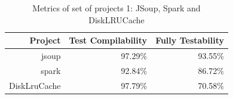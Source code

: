 \begin{figure}[!htb]
\begin{minipage}{.5\textwidth}
        \label{fig:disklrucache}
    \end{minipage}%
\end{figure}

\begin{table}[h!]
    \centering
    \begin{tabular}{|r|r|r|}
    \hline
    \textbf{Project} & \textbf{Test Compilability} & \textbf{Fully Testability} \\ \hline
    jsoup            & 97.29\%                      & 93.55\%                      \\ \hline
    spark            & 92.84\%                      & 86.72\%                      \\ \hline
    DiskLruCache     & 97.79\%                      & 70.58\%                      \\ \hline
    \end{tabular}
    \caption{Metrics of set of projects 1: JSoup, Spark and DiskLRUCache}
    \label{table:projects-1}
\end{table}


